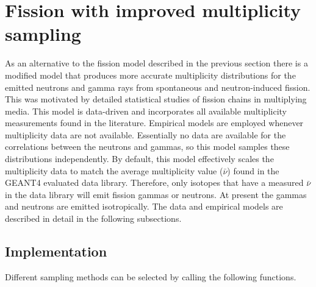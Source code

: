 \documentclass[11pt]{article}
\begin{document}
\section{Fission with improved multiplicity sampling}

As an alternative to the fission model described in the previous
section there is a modified model that produces more accurate
multiplicity distributions for the emitted neutrons and gamma rays
from spontaneous and neutron-induced fission. This was motivated by
detailed statistical studies of fission chains in multiplying
media. This model is data-driven and incorporates all available
multiplicity measurements found in the literature. Empirical models
are employed whenever multiplicity data are not available.
Essentially no data are available for the correlations between the
neutrons and gammas, so this model samples these distributions
independently. By default, this model effectively scales the
multiplicity data to match the average multiplicity value
($\bar{\nu}$) found in the GEANT4 evaluated data library. Therefore,
only isotopes that have a measured $\bar{\nu}$ in the data library
will emit fission gammas or neutrons. At present the gammas and
neutrons are emitted isotropically. The data and empirical models are
described in detail in the following subsections.



\subsection{Implementation}



Different sampling methods can be selected by calling the following functions.


\clearpage
\begin{thebibliography}{99}

\end{thebibliography}
\end{document}
